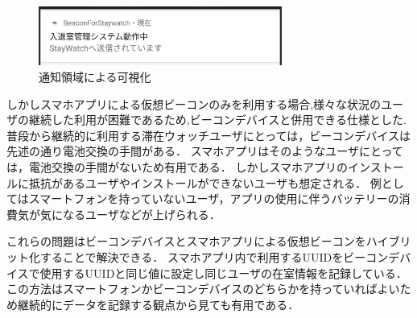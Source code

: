 \begin{figure}[tbh]
  \centering
  \includegraphics[width=8cm]{image/notify.jpg}
  \caption{通知領域による可視化}
  \label{multipleBPM}
\end{figure}
 しかしスマホアプリによる仮想ビーコンのみを利用する場合,様々な状況のユーザの継続した利用が困難であるため,ビーコンデバイスと併用できる仕様とした.
 普段から継続的に利用する滞在ウォッチユーザにとっては，ビーコンデバイスは先述の通り電池交換の手間がある．
スマホアプリはそのようなユーザにとっては，電池交換の手間がないため有用である．
 しかしスマホアプリのインストールに抵抗があるユーザやインストールができないユーザも想定される．
例としてはスマートフォンを持っていないユーザ，アプリの使用に伴うバッテリーの消費気が気になるユーザなどが上げられる．

 これらの問題はビーコンデバイスとスマホアプリによる仮想ビーコンをハイブリット化することで解決できる．
スマホアプリ内で利用するUUIDをビーコンデバイスで使用するUUIDと同じ値に設定し同じユーザの在室情報を記録している．
この方法はスマートフォンかビーコンデバイスのどちらかを持っていればよいため継続的にデータを記録する観点から見ても有用である．













